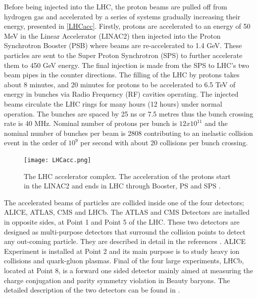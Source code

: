 Before being injected into the LHC, the proton beams are pulled off from hydrogen gas and accelerated by a series of systems gradually increasing their energy, presented in \autoref{LHCacc}. Firstly, protons are accelerated to an energy of 50 MeV in the Linear Accelerator (LINAC2) then injected into the Proton Synchrotron Booster (PSB) where beams are re-accelerated to 1.4 GeV. These particles are sent to the Super Proton Synchrotron (SPS) to further accelerate them to 450 GeV energy. The final injection is made from the SPS to LHC's two beam pipes in the counter directions. The filling of the LHC by protons takes about 8 minutes, and 20 minutes for protons to be accelerated to 6.5 TeV of energy in bunches via Radio Frequency (RF) cavities operating. The injected beams circulate the LHC rings for many hours (12 hours) under normal operation. The bunches are spaced by 25 ns or 7.5 metres thus the bunch crossing rate is 40 MHz. Nominal number of protons per bunch is $12x10^{11}$ and the nominal number of bunches per beam is 2808 contributing to an inelastic collision event in the order of $10^9$ per second with about 20 collisions per bunch crossing.

\begin{figure}[ht]
	\centering
	\texttt{[image: LHCacc.png]}
	\vspace{2mm}
	\caption[The LHC accelerator complex. The acceleration of the protons start in the LINAC2 and ends in LHC through Booster, PS and SPS.]
	{The LHC accelerator complex. The acceleration of the protons start in the LINAC2 and ends in LHC through Booster, PS and SPS \cite{Mobs:2197559}.}
	\label{LHCacc}
\end{figure}

The accelerated beams of particles are collided inside one of the four detectors; ALICE, ATLAS, CMS and LHCb. The ATLAS and CMS Detectors are installed in opposite sides, at Point 1 and Point 5 of the LHC. These two detectors are designed as multi-purpose detectors that surround the collision points to detect any out-coming particle. They are described in detail in the references \cite{ATLAS2008, CMS2008}. ALICE Experiment is installed at Point 2 and its main purpose is to study heavy ion collisions and quark-gluon plasmas. Final of the four large experiments, LHCb, located at Point 8, is a forward one sided detector mainly aimed at measuring the charge conjugation and parity symmetry violation in Beauty baryons. The detailed description of the two detectors can be found in \cite{ALICE2008, LHCb2008}.

